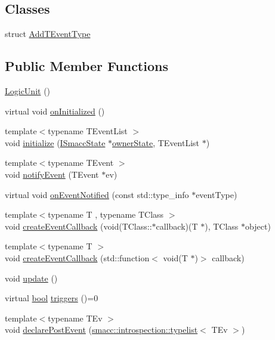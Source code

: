 \subsection*{Classes}
\begin{DoxyCompactItemize}
\item 
struct \hyperlink{structsmacc_1_1LogicUnit_1_1AddTEventType}{Add\+T\+Event\+Type}
\end{DoxyCompactItemize}
\subsection*{Public Member Functions}
\begin{DoxyCompactItemize}
\item 
\hyperlink{classsmacc_1_1LogicUnit_a5c015b00d4c0c3d379cfae8e26a1d474}{Logic\+Unit} ()
\item 
virtual void \hyperlink{classsmacc_1_1LogicUnit_ade7f409516683f13754943db1081bac0}{on\+Initialized} ()
\item 
{\footnotesize template$<$typename T\+Event\+List $>$ }\\void \hyperlink{classsmacc_1_1LogicUnit_ad6abed2fa372c64c7ca7330073ef8c95}{initialize} (\hyperlink{classsmacc_1_1ISmaccState}{I\+Smacc\+State} $\ast$\hyperlink{classsmacc_1_1LogicUnit_a8863d227f46868876632b07b500f27d6}{owner\+State}, T\+Event\+List $\ast$)
\item 
{\footnotesize template$<$typename T\+Event $>$ }\\void \hyperlink{classsmacc_1_1LogicUnit_a1c2bee307f2586bc34c0b75fbc4f6fcf}{notify\+Event} (T\+Event $\ast$ev)
\item 
virtual void \hyperlink{classsmacc_1_1LogicUnit_a3a81929b2014b10d0fa28d4bc2d19d9c}{on\+Event\+Notified} (const std\+::type\+\_\+info $\ast$event\+Type)
\item 
{\footnotesize template$<$typename T , typename T\+Class $>$ }\\void \hyperlink{classsmacc_1_1LogicUnit_a58683bd62b8100434dd4a2e4df5382b9}{create\+Event\+Callback} (void(T\+Class\+::$\ast$callback)(T $\ast$), T\+Class $\ast$object)
\item 
{\footnotesize template$<$typename T $>$ }\\void \hyperlink{classsmacc_1_1LogicUnit_a42103eec6907aaa60f297145ba6ca123}{create\+Event\+Callback} (std\+::function$<$ void(T $\ast$)$>$ callback)
\item 
void \hyperlink{classsmacc_1_1LogicUnit_afcec0608a17e039791403472a2411539}{update} ()
\item 
virtual \hyperlink{classbool}{bool} \hyperlink{classsmacc_1_1LogicUnit_ae975a96f0210412e1cb4a7b5b948ade6}{triggers} ()=0
\item 
{\footnotesize template$<$typename T\+Ev $>$ }\\void \hyperlink{classsmacc_1_1LogicUnit_a4daf7250a0af4cff8703258668efb3e3}{declare\+Post\+Event} (\hyperlink{structsmacc_1_1introspection_1_1typelist}{smacc\+::introspection\+::typelist}$<$ T\+Ev $>$)
\end{DoxyCompactItemize}
